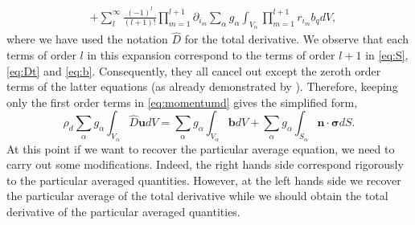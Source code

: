 {\begin{align}
    \label{eq:b}
    &+
    \sum_l^\infty
    \frac{(-1)^{l}}{(l+1)!}
    \prod^{l+1}_{m=1}
    \partial_{i_m}
    \sum_{\alpha}
    g_{\alpha}
            \int_{V_\alpha}
            \prod^{l+1}_{m=1} r_{i_m} b_q
        dV,
\end{align}
where we have used the notation $\hat{D}$ for the total derivative.
We observe that each terms of order $l$ in this expansion correspond to the terms of order $l+1$ in \ref{eq:S}, \ref{eq:Dt} and \ref{eq:b}.
Consequently, they all cancel out except the zeroth order terms of the latter equations (as already demonstrated by \citet{prosperetti2004average}).
Therefore, keeping only the first order terms in \ref{eq:momentumd} gives the simplified form,
\begin{equation*}
    \rho_d \sum_\alpha g_\alpha \int_{V_\alpha} \hat{D} \bm{u}  dV
    =  \sum_\alpha g_\alpha \int_{V_\alpha} \bm{b} dV
    +\sum_\alpha g_\alpha\int_{S_\alpha}  \bm{n}\cdot\bm{\sigma} dS.
\end{equation*}
At this point if we want to recover the particular average equation, we need to carry out some modifications.
Indeed, the right hands side correspond rigorously to the particular averaged quantities.
However, at the left hands side we recover the particular average of the total derivative while we should obtain the total derivative of the particular averaged quantities.

}
